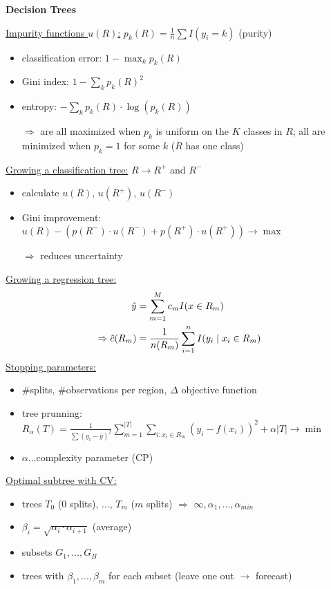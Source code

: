 \documentclass[10pt,landscape,a4paper]{article}
\begin{document}
\begin{multicols*}{4}
\begin{center}
	\normalsize{\textbf{Decision Trees}} \\
\end{center}
\underline{Impurity functions $u(R)$:} $p_k(R) = \frac{1}{n}\sum I(y_i=k)$ (purity)
\begin{itemize}
	\item classification error: $1-\max_k p_k(R)$
	\item Gini index: $1-\sum_k p_k(R)^2$
	\item entropy: $-\sum_k p_k(R)\cdot\log(p_k(R))$
	\item[$\Rightarrow$] are all maximized when $p_k$ is uniform on the $K$ classes in $R$; all are minimized when $p_k = 1$ for some $k$ ($R$ has one class)
\end{itemize}
\underline{Growing a classification tree:} $R\to R^+$ and $R^-$
\begin{itemize}
	\item calculate $u(R)$, $u(R^+)$, $u(R^-)$
	\item Gini improvement: $u(R) - (p(R^-)\cdot u(R^-) + p(R^+)\cdot u(R^+)) \to\max$
	\item[$\Rightarrow$] reduces uncertainty
\end{itemize}
\underline{Growing a regression tree:}
\begin{align}
	\hat{y} &= \sum_{m=1}^M c_mI(x\in R_m) \notag \\
	\Rightarrow \hat{c}(R_m) &= \frac{1}{n(R_m)}\sum_{i=1}^n I(y_i\mid x_i\in R_m) \notag
\end{align}
\underline{Stopping parameters:}
\begin{itemize}
	\item \#splits, \#observations per region, $\Delta$ objective function
	\item tree prunning: $R_\alpha(T) = \frac{1}{\sum (y_i-\bar{y})^2}\sum_{m=1}^{\vert T\vert}\sum_{i:x_i\in R_m} (y_i-f(x_i))^2 + \alpha\vert T\vert\to\min$
	\item $\alpha$...complexity parameter (CP)
\end{itemize}
\underline{Optimal subtree with CV:}
\begin{itemize}
	\item trees $T_0$ (0 splits), ..., $T_m$ ($m$ splits) $\Rightarrow$ $\infty,\alpha_1,...,\alpha_{min}$
	\item $\beta_i = \sqrt{\alpha_i \cdot\alpha_{i+1}}$ (average)
	\item subsets $G_1,...,G_B$
	\item trees with $\beta_1,...,\beta_m$ for each subset (leave one out $\to$ forecast)

\end{itemize}
\end{multicols*}
\end{document}
